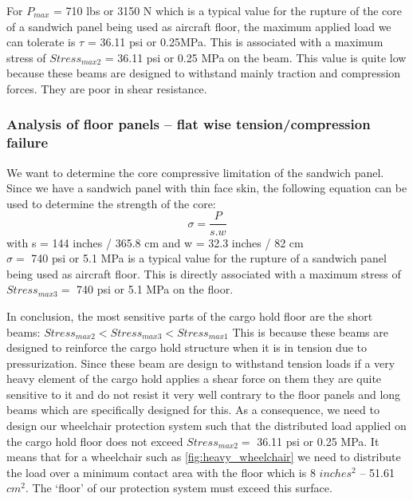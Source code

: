 For $P_{max}$ = 710 lbs or 3150 N which is a typical value for the rupture of the core of a sandwich panel being used as aircraft floor, the maximum applied load we can tolerate is $ \tau$ = 36.11 psi or 0.25MPa.
This is associated with a maximum stress of $Stress_{max 2}$ = 36.11 psi or 0.25 MPa on the beam. This value is quite low because these beams are designed to withstand mainly traction and compression forces. They are poor in shear resistance.
\subsubsection{Analysis of floor panels – flat wise tension/compression failure}
We want to determine the core compressive limitation of the sandwich panel. Since we have a sandwich panel with thin face skin, the following equation can be used to determine the strength of the core:
\[ \sigma = \frac{P}{s.w} \]
with s = 144 inches / 365.8 cm and w = 32.3 inches / 82 cm \\
$ \sigma =$ 740 psi or 5.1 MPa is a typical value for the rupture of a sandwich panel being used as aircraft floor. This is directly associated with a maximum stress of $ Stress_{max 3} =$ 740 psi or 5.1 MPa on the floor.

In conclusion, the most sensitive parts of the cargo hold floor are the short beams:
$Stress_{max 2} < Stress_{max 3} < Stress_{max 1}$
 This is because these beams are designed to reinforce the cargo hold structure when it is in tension due to pressurization. Since these beam are design to withstand tension loads if a very heavy element of the cargo hold applies a shear force on them they are quite sensitive to it and do not resist it very well contrary to the floor panels and long beams which are specifically designed for this.
As a consequence, we need to design our wheelchair protection system such that the distributed load applied on the cargo hold floor does not exceed $ Stress_{max 2} =$ 36.11 psi or 0.25 MPa. It means that for a wheelchair such as \ref{fig:heavy_wheelchair} we need to distribute the load over a minimum contact area with the floor which is 8 $inches^2$ – 51.61 $cm^2$. The ‘floor’ of our protection system must exceed this surface.



